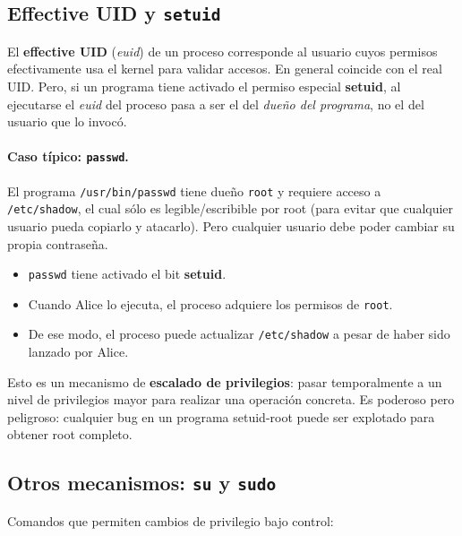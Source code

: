 \documentclass[11pt,a4paper]{article}
\begin{document}
\subsection{Effective UID y \texttt{setuid}}

\begin{definicion}
El \textbf{effective UID} (\emph{euid}) de un proceso corresponde al
usuario cuyos permisos efectivamente usa el kernel para validar
accesos. En general coincide con el real UID. Pero, si un programa
tiene activado el permiso especial \textbf{setuid}, al ejecutarse el
\emph{euid} del proceso pasa a ser el del \emph{dueño del programa},
no el del usuario que lo invocó.
\end{definicion}

\paragraph{Caso típico: \texttt{passwd}.}
El programa \verb|/usr/bin/passwd| tiene dueño \texttt{root} y requiere
acceso a \verb|/etc/shadow|, el cual sólo es legible/escribible por
root (para evitar que cualquier usuario pueda copiarlo y atacarlo).
Pero cualquier usuario debe poder cambiar su propia contraseña.

\begin{itemize}[leftmargin=*,nosep]
    \item \texttt{passwd} tiene activado el bit \textbf{setuid}.
    \item Cuando Alice lo ejecuta, el proceso adquiere los permisos de
        \texttt{root}.
    \item De ese modo, el proceso puede actualizar \verb|/etc/shadow|
        a pesar de haber sido lanzado por Alice.
\end{itemize}

\begin{importante}
Esto es un mecanismo de \textbf{escalado de privilegios}: pasar
temporalmente a un nivel de privilegios mayor para realizar una
operación concreta. Es poderoso pero peligroso: cualquier bug en un
programa setuid-root puede ser explotado para obtener root completo.
\end{importante}

\subsection{Otros mecanismos: \texttt{su} y \texttt{sudo}}

Comandos que permiten cambios de privilegio bajo control:
\end{document}

